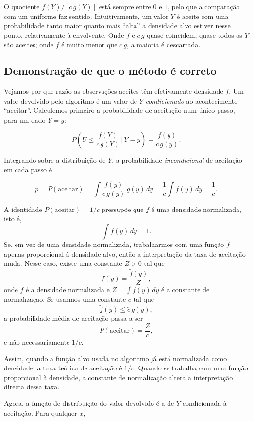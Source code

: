 \documentclass[
  portuguese,
  11pt,
  openany]{book}
\begin{document}
O quociente \(f(Y)/[c\,g(Y)]\) está sempre entre \(0\) e \(1\), pelo que a comparação
com um uniforme faz sentido. Intuitivamente, um valor \(Y\) é aceite com uma
probabilidade tanto maior quanto mais ``alta'' a densidade alvo estiver nesse
ponto, relativamente à envolvente. Onde \(f\) e \(c\,g\) quase coincidem, quase
todos os \(Y\) são aceites; onde \(f\) é muito menor que \(c\,g\), a maioria é
descartada.

\subsection{Demonstração de que o método é correto}\label{demonstrauxe7uxe3o-de-que-o-muxe9todo-uxe9-correto}

Vejamos por que razão as observações aceites têm efetivamente densidade \(f\).
Um valor devolvido pelo algoritmo é um valor de \(Y\) \emph{condicionado} ao
acontecimento ``aceitar''. Calculemos primeiro a probabilidade de aceitação num
único passo, para um dado \(Y = y\):

\[
P\!\left(U \leq \frac{f(Y)}{c\,g(Y)} \,\Big|\, Y = y\right)
= \frac{f(y)}{c\,g(y)} .
\]

Integrando sobre a distribuição de \(Y\), a probabilidade \emph{incondicional} de
aceitação em cada passo é

\[
p = P(\text{aceitar})
= \int \frac{f(y)}{c\,g(y)}\, g(y)\, dy
= \frac{1}{c}\int f(y)\, dy
= \frac{1}{c}.
\]

A identidade \(P(\text{aceitar})=1/c\) pressupõe que \(f\) é uma densidade
normalizada, isto é,
\[
\int f(y)\,dy = 1.
\]
Se, em vez de uma densidade normalizada, trabalharmos com uma função
\(\tilde f\) apenas proporcional à densidade alvo, então a interpretação da
taxa de aceitação muda. Nesse caso, existe uma constante \(Z>0\) tal que
\[
f(y)=\frac{\tilde f(y)}{Z},
\]
onde \(f\) é a densidade normalizada e \(Z=\int \tilde f(y)\,dy\) é a constante
de normalização. Se usarmos uma constante \(\tilde c\) tal que
\[
\tilde f(y) \leq \tilde c\,g(y),
\]
a probabilidade média de aceitação passa a ser
\[
P(\text{aceitar})=\frac{Z}{\tilde c},
\]
e não necessariamente \(1/\tilde c\).

Assim, quando a função alvo usada no algoritmo já está normalizada como
densidade, a taxa teórica de aceitação é \(1/c\). Quando se trabalha com uma
função proporcional à densidade, a constante de normalização altera a
interpretação directa dessa taxa.

Agora, a função de distribuição do valor devolvido é a de \(Y\) condicionada à
aceitação. Para qualquer \(x\),
\end{document}
